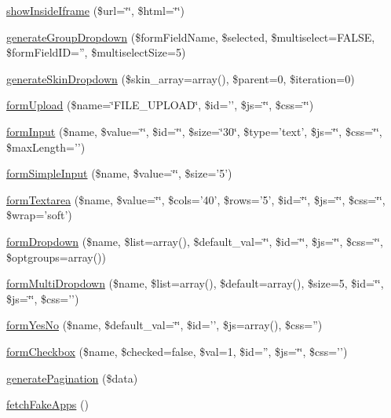 \begin{DoxyCompactItemize}
\hyperlink{classadmin_output_ac7f9250b6c30735c742365a4da48d778}{show\-Inside\-Iframe} (\$url=\char`\"{}\char`\"{}, \$html=\char`\"{}\char`\"{})
\item 
\hyperlink{classadmin_output_aa90a1765e99972ba09e20216912b5344}{generate\-Group\-Dropdown} (\$form\-Field\-Name, \$selected, \$multiselect=F\-A\-L\-S\-E, \$form\-Field\-I\-D='', \$multiselect\-Size=5)
\item 
\hyperlink{classadmin_output_ab91d196557ad72ca2a160ab6346a8506}{generate\-Skin\-Dropdown} (\$skin\-\_\-array=array(), \$parent=0, \$iteration=0)
\item 
\hyperlink{classadmin_output_a591fbb68a94b89e40b7a469133db813c}{form\-Upload} (\$name=\char`\"{}F\-I\-L\-E\-\_\-\-U\-P\-L\-O\-A\-D\char`\"{}, \$id='', \$js=\char`\"{}\char`\"{}, \$css=\char`\"{}\char`\"{})
\item 
\hyperlink{classadmin_output_aadc8385e22ab19bfc84266cf2d4d91d1}{form\-Input} (\$name, \$value=\char`\"{}\char`\"{}, \$id=\char`\"{}\char`\"{}, \$size=\char`\"{}30\char`\"{}, \$type='text', \$js=\char`\"{}\char`\"{}, \$css=\char`\"{}\char`\"{}, \$max\-Length='')
\item 
\hyperlink{classadmin_output_af21572ee928d9163307f076c67a734e0}{form\-Simple\-Input} (\$name, \$value=\char`\"{}\char`\"{}, \$size='5')
\item 
\hyperlink{classadmin_output_ac8948f6a37bcdca35c47a7e5ce40ef0c}{form\-Textarea} (\$name, \$value=\char`\"{}\char`\"{}, \$cols='40', \$rows='5', \$id=\char`\"{}\char`\"{}, \$js=\char`\"{}\char`\"{}, \$css=\char`\"{}\char`\"{}, \$wrap='soft')
\item 
\hyperlink{classadmin_output_aeffe2ce410c89d3b59c355baaa63c39a}{form\-Dropdown} (\$name, \$list=array(), \$default\-\_\-val=\char`\"{}\char`\"{}, \$id=\char`\"{}\char`\"{}, \$js=\char`\"{}\char`\"{}, \$css=\char`\"{}\char`\"{}, \$optgroups=array())
\item 
\hyperlink{classadmin_output_aefc4c762164211ee76a7f90dee84a41e}{form\-Multi\-Dropdown} (\$name, \$list=array(), \$default=array(), \$size=5, \$id=\char`\"{}\char`\"{}, \$js=\char`\"{}\char`\"{}, \$css='')
\item 
\hyperlink{classadmin_output_ac5b14169046af69da06d124aa3e475a8}{form\-Yes\-No} (\$name, \$default\-\_\-val=\char`\"{}\char`\"{}, \$id='', \$js=array(), \$css='')
\item 
\hyperlink{classadmin_output_a5046f42d4ba41555aa1898dbf30d6521}{form\-Checkbox} (\$name, \$checked=false, \$val=1, \$id='', \$js=\char`\"{}\char`\"{}, \$css='')
\item 
\hyperlink{classadmin_output_a329bbab93d8befbc3e5307ec9fac1fcc}{generate\-Pagination} (\$data)
\item 
\hyperlink{classadmin_output_ad8e025007efe84fa4c4e86cf6052237d}{fetch\-Fake\-Apps} ()
\end{DoxyCompactItemize}
